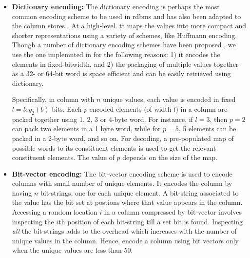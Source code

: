 \begin{itemize}
	\item \textbf{Dictionary encoding:} The dictionary encoding is perhaps the most common encoding scheme to be used in \gls{rdbms} and has also been adapted to the column stores \cite{abadi-col-comp, boncz-comp}. At a high-level. tt maps the values into more compact and shorter representations using a variety of schemes, like Huffmann encoding. Though a number of dictionary encoding schemes have been proposed \cite{boncz-comp, dat-comp, abadi-col-comp}, we use the one implemnted in \cite{abadi-col-comp} for the following reasons: 1) it encodes the elements in fixed-bitwidth, and 2) the packaging of multiple values together as a 32- or 64-bit word is space efficient and can be easily retrieved using dictionary.
	
	Specifically, in column with $n$ unique values, each value is encoded in fixed $l=log_2(b)$ bits. Each $p$ encoded elements (of width $l$) in a column are packed together using 1, 2, 3 or 4-byte word. For instance, if $l=3$, then $p=2$ can pack two elements in a 1 byte word, while for $p=5$, 5 elements can be packed in a 2-byte word, and so on. For decoding, a pre-populated map of possible words to its constituent elements is used to get the relevant constituent elements. The value of $p$ depends on the size of the map. 
	
	\item \textbf{Bit-vector encoding:} The bit-vector encoding scheme is used to encode columns with small number of unique elements. It encodes the column by having $n$ bit-strings, one for each unique element. A bit-string associated to the value has the bit set at postions where that value appears in the column. Accessing a random location $i$ in a column compressed by bit-vector involves inspecting the $i$th position of each bit-string till a set bit is found. Inspecting \emph{all} the bit-strings adds to the overhead which increases with the number of unique values in the column. Hence, encode a column using bit vectors only when the unique values are less than 50.
	

\end{itemize}
